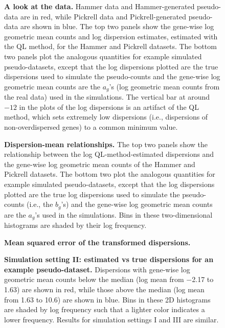 \documentclass[10pt]{article}
\begin{document}
\begin{figure}[!ht]
   \centering
   \caption{{\bf A look at the data.} Hammer data and Hammer-generated pseudo-data are in red, while Pickrell data and Pickrell-generated pseudo-data are shown in blue. The top two panels show the gene-wise log geometric mean counts and log dispersion estimates, estimated with the QL method, for the Hammer and Pickrell datasets. The bottom two panels plot the analogous quantities for example simulated pseudo-datasets, except that the log dispersions plotted are the true dispersions used to simulate the pseudo-counts and the gene-wise log geometric mean counts are the $a_g$'s (log geometric mean counts from the real data) used in the simulations. The vertical bar at around $-12$ in the plots of the log dispersions is an artifact of the QL method, which sets  extremely low dispersions (i.e., dispersions of non-overdispersed genes) to a common minimum value.}
   \label{fig:hists}
\end{figure}

\begin{figure}[!ht]
   \centering
   \caption{{\bf Dispersion-mean relationships.} The top two panels show the relationship between the log QL-method-estimated dispersions and the gene-wise log geometric mean counts of the Hammer and Pickrell datasets. The bottom two plot the analogous quantities for example simulated pseudo-datasets, except that the log dispersions plotted are the true log dispersions used to simulate the pseudo-counts (i.e., the $b_g$'s) and the gene-wise log geometric mean counts are the $a_g$'s used in the simulations. Bins in these two-dimensional histograms are shaded by their log frequency.}
   \label{fig:meandispscatter}
\end{figure}

\begin{figure}[!ht] %
   \centering
   \caption{{\bf Mean squared error of the transformed dispersions.}}
   \label{fig:mse}
\end{figure}

\begin{figure}[!ht] %
   \centering
   \caption{{\bf Simulation setting II: estimated vs true dispersions for an example pseudo-dataset.} Dispersions with gene-wise log geometric mean counts below the median (log mean from $-$2.17 to 1.63) are shown in red, while those above the median (log mean from 1.63 to 10.6) are shown in blue. Bins in these 2D histograms are shaded by log frequency such that a lighter color indicates a lower frequency. Results for simulation settings I and III are similar. }
   \label{fig:pp2}
\end{figure}
\end{document}
